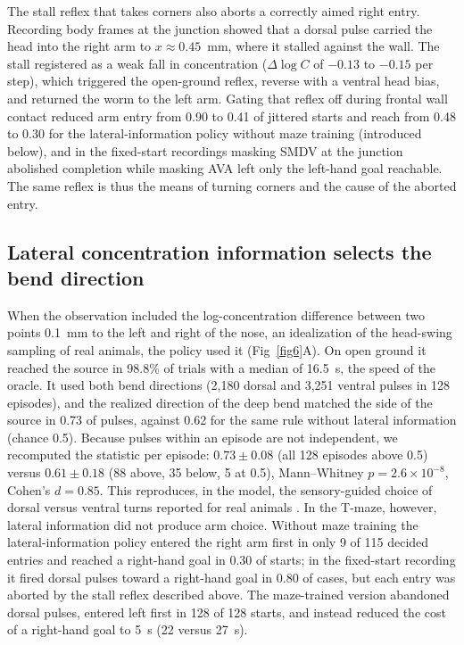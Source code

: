 \documentclass[11pt,a4paper]{article}
\begin{document}
The stall reflex that takes corners also aborts a correctly aimed right entry. Recording body frames at the junction showed that a dorsal pulse carried the head into the right arm to $x \approx 0.45$~mm, where it stalled against the wall. The stall registered as a weak fall in concentration ($\Delta \log C$ of $-0.13$ to $-0.15$ per step), which triggered the open-ground reflex, reverse with a ventral head bias, and returned the worm to the left arm. Gating that reflex off during frontal wall contact reduced arm entry from 0.90 to 0.41 of jittered starts and reach from 0.48 to 0.30 for the lateral-information policy without maze training (introduced below), and in the fixed-start recordings masking SMDV at the junction abolished completion while masking AVA left only the left-hand goal reachable. The same reflex is thus the means of turning corners and the cause of the aborted entry.

\subsection*{Lateral concentration information selects the bend direction}
When the observation included the log-concentration difference between two points 0.1~mm to the left and right of the nose, an idealization of the head-swing sampling of real animals, the policy used it (Fig~\ref{fig6}A). On open ground it reached the source in 98.8\% of trials with a median of 16.5~s, the speed of the oracle. It used both bend directions (2,180 dorsal and 3,251 ventral pulses in 128 episodes), and the realized direction of the deep bend matched the side of the source in 0.73 of pulses, against 0.62 for the same rule without lateral information (chance 0.5). Because pulses within an episode are not independent, we recomputed the statistic per episode: $0.73 \pm 0.08$ (all 128 episodes above 0.5) versus $0.61 \pm 0.18$ (88 above, 35 below, 5 at 0.5), Mann--Whitney $p = 2.6 \times 10^{-8}$, Cohen's $d = 0.85$. This reproduces, in the model, the sensory-guided choice of dorsal versus ventral turns reported for real animals \cite{r11}. In the T-maze, however, lateral information did not produce arm choice. Without maze training the lateral-information policy entered the right arm first in only 9 of 115 decided entries and reached a right-hand goal in 0.30 of starts; in the fixed-start recording it fired dorsal pulses toward a right-hand goal in 0.80 of cases, but each entry was aborted by the stall reflex described above. The maze-trained version abandoned dorsal pulses, entered left first in 128 of 128 starts, and instead reduced the cost of a right-hand goal to 5~s (22 versus 27~s).
\end{document}
